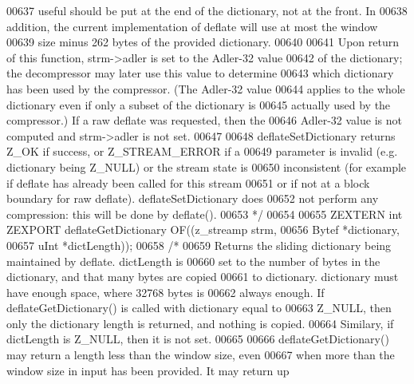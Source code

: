 \begin{DoxyCode}
00637 \textcolor{comment}{   useful should be put at the end of the dictionary, not at the front.  In}
00638 \textcolor{comment}{   addition, the current implementation of deflate will use at most the window}
00639 \textcolor{comment}{   size minus 262 bytes of the provided dictionary.}
00640 \textcolor{comment}{}
00641 \textcolor{comment}{     Upon return of this function, strm->adler is set to the Adler-32 value}
00642 \textcolor{comment}{   of the dictionary; the decompressor may later use this value to determine}
00643 \textcolor{comment}{   which dictionary has been used by the compressor.  (The Adler-32 value}
00644 \textcolor{comment}{   applies to the whole dictionary even if only a subset of the dictionary is}
00645 \textcolor{comment}{   actually used by the compressor.) If a raw deflate was requested, then the}
00646 \textcolor{comment}{   Adler-32 value is not computed and strm->adler is not set.}
00647 \textcolor{comment}{}
00648 \textcolor{comment}{     deflateSetDictionary returns Z\_OK if success, or Z\_STREAM\_ERROR if a}
00649 \textcolor{comment}{   parameter is invalid (e.g.  dictionary being Z\_NULL) or the stream state is}
00650 \textcolor{comment}{   inconsistent (for example if deflate has already been called for this stream}
00651 \textcolor{comment}{   or if not at a block boundary for raw deflate).  deflateSetDictionary does}
00652 \textcolor{comment}{   not perform any compression: this will be done by deflate().}
00653 \textcolor{comment}{*/}
00654 
00655 ZEXTERN \textcolor{keywordtype}{int} ZEXPORT deflateGetDictionary OF((z\_streamp strm,
00656                                              Bytef *dictionary,
00657                                              uInt  *dictLength));
00658 \textcolor{comment}{/*}
00659 \textcolor{comment}{     Returns the sliding dictionary being maintained by deflate.  dictLength is}
00660 \textcolor{comment}{   set to the number of bytes in the dictionary, and that many bytes are copied}
00661 \textcolor{comment}{   to dictionary.  dictionary must have enough space, where 32768 bytes is}
00662 \textcolor{comment}{   always enough.  If deflateGetDictionary() is called with dictionary equal to}
00663 \textcolor{comment}{   Z\_NULL, then only the dictionary length is returned, and nothing is copied.}
00664 \textcolor{comment}{   Similary, if dictLength is Z\_NULL, then it is not set.}
00665 \textcolor{comment}{}
00666 \textcolor{comment}{     deflateGetDictionary() may return a length less than the window size, even}
00667 \textcolor{comment}{   when more than the window size in input has been provided. It may return up}

\end{DoxyCode}
